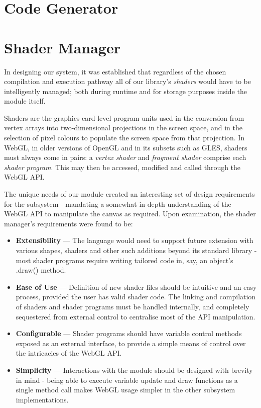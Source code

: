 \documentclass{l3proj}
\begin{document}
\section{Code Generator}
\label{arch-gen}

\section{Shader Manager}
\label{arch-shad}

In designing our system, it was established that regardless of the chosen compilation and execution pathway all of our library's \textit{shaders} would have to be intelligently managed; both during runtime and for storage purposes inside the module itself.

Shaders are the graphics card level program units used in the conversion from vertex arrays into two-dimensional projections in the screen space, and in the selection of pixel colours to populate the screen space from that projection. In WebGL, in older versions of OpenGL and in its subsets such as GLES, shaders must always come in pairs: a \textit{vertex shader} and \textit{fragment shader} comprise each \textit{shader program}. This may then be accessed, modified and called through the WebGL API.

The unique needs of our module created an interesting set of design requirements for the subsystem - mandating a somewhat in-depth understanding of the WebGL API to manipulate the canvas as required. Upon examination, the shader manager's requirements were found to be:
\begin{itemize}
\item \textbf{Extensibility} --- The language would need to support future extension with various shapes, shaders and other such additions beyond its standard library - most shader programs require writing tailored code in, say, an object's .draw() method.
\item \textbf{Ease of Use} --- Definition of new shader files should be intuitive and an easy process, provided the user has valid shader code. The linking and compilation of shaders and shader programs must be handled internally, and completely sequestered from external control to centralise most of the API manipulation.
\item \textbf{Configurable} --- Shader programs should have variable control methods exposed as an external interface, to provide a simple means of control over the intricacies of the WebGL API.
\item \textbf{Simplicity} --- Interactions with the module should be designed with brevity in mind - being able to execute variable update and draw functions as a single method call makes WebGL usage simpler in the other subsystem implementations.
\end{itemize}
\end{document}
